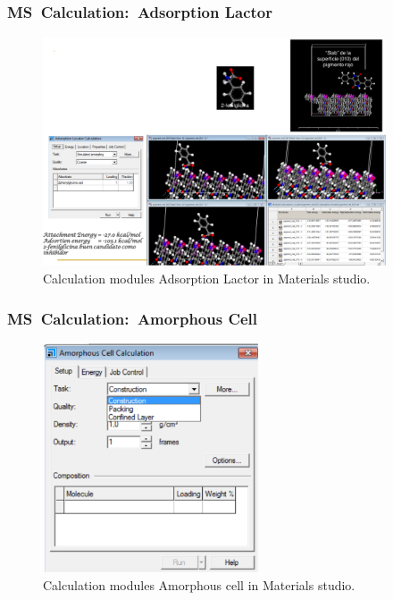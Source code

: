 \frame
{
	\frametitle{\textrm{MS~Calculation:~Adsorption Lactor}}
\begin{figure}[h!]
\centering
\vspace*{-0.18in}
\includegraphics[height=2.67in,width=4.00in,viewport=0 0 1093 728,clip]{Figures/MS-Caluculator_Adsorption-Lactor-example.png}
\caption{\tiny \textrm{Calculation modules Adsorption Lactor in Materials studio.}}%
\label{MS-Adsorption_Lactor}
\end{figure}
}

\frame
{
	\frametitle{\textrm{MS~Calculation:~Amorphous Cell}}
\begin{figure}[h!]
\centering
\vspace*{-0.18in}
\includegraphics[height=2.67in,width=2.53in,viewport=0 0 702 750,clip]{Figures/MS-Caluculator_Amorphous-Cell-parameter.png}
\caption{\tiny \textrm{Calculation modules Amorphous cell in Materials studio.}}%
\label{MS-Amorphous_cell}
\end{figure}
}

